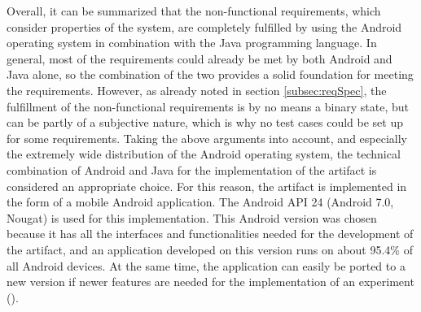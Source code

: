 Overall, it can be summarized that the non-functional requirements, which consider properties of the system, are completely fulfilled by using the Android operating system in combination with the Java programming language. In general, most of the requirements could already be met by both Android and Java alone, so the combination of the two provides a solid foundation for meeting the requirements. However, as already noted in section \ref{subsec:reqSpec}, the fulfillment of the non-functional requirements is by no means a binary state, but can be partly of a subjective nature, which is why no test cases could be set up for some requirements. Taking the above arguments into account, and especially the extremely wide distribution of the Android operating system, the technical combination of Android and Java for the implementation of the artifact is considered an appropriate choice. For this reason, the artifact is implemented in the form of a mobile Android application. The Android API 24 (Android 7.0, Nougat) is used for this implementation. This Android version was chosen because it has all the interfaces and functionalities needed for the development of the artifact, and an application developed on this version runs on about 95.4\% of all Android devices. At the same time, the application can easily be ported to a new version if newer features are needed for the implementation of an experiment (\cite{Google.2023}). 

